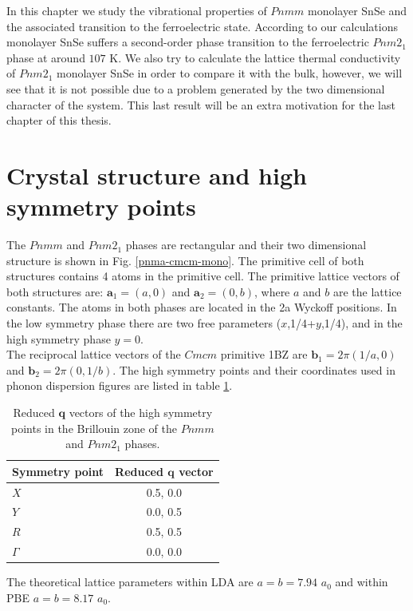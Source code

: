 In this chapter we study the vibrational properties of $Pnmm$ monolayer SnSe and the associated transition to the 
ferroelectric state. According to our calculations monolayer SnSe suffers a second-order phase transition to the 
ferroelectric $Pnm2_{1}$ phase at around $107$ K. We also try to calculate the lattice thermal conductivity of 
$Pnm2_{1}$ monolayer SnSe in order to compare it with the bulk, however, we will see that it is not possible due to 
a problem generated by the two dimensional character of the system. This last result will be an extra motivation for 
the last chapter of this thesis.

\section{Crystal structure and high symmetry points}

The $Pnmm$ and $Pnm2_{1}$ phases are rectangular and their two dimensional structure is shown in 
Fig. \ref{pnma-cmcm-mono}. The primitive cell of both structures contains 4 atoms in the primitive cell. The 
primitive lattice vectors of both structures are: $\mathbf{a}_{1}=(a,0)$ and $\mathbf{a}_{2}=(0,b)$, where $a$ and 
$b$ are the lattice constants. The atoms in both phases are located in the 2a Wyckoff positions. In the low symmetry 
phase there are two free parameters ($x$,1/4+$y$,1/4), and in the high symmetry phase $y=0$. \\

The reciprocal lattice vectors of the $Cmcm$ primitive 1BZ are $\mathbf{b}_{1}=2\pi(1/a,0)$ and 
$\mathbf{b}_{2}=2\pi(0,1/b)$. The high symmetry points and their coordinates used in phonon dispersion figures are 
listed in table \ref{qpoints-mono}.
\begin{table}
\begin{center}
\begin{tabular*}{0.45\textwidth}{l c}
 \hline
 \hline
             Symmetry point  & Reduced $\mathbf{q}$ vector  \\
 \hline
 $X$                  &  0.5, 0.0 \\
 $Y$                  &  0.0, 0.5 \\
 $R$                  &  0.5, 0.5  \\
 $\Gamma$             &  0.0, 0.0  \\
 \hline
 \hline
\end{tabular*}
\end{center}
\caption{Reduced $\mathbf{q}$ vectors of the high symmetry points in the Brillouin zone of the $Pnmm$ and $Pnm2_{1}$ 
phases.}
\label{qpoints-mono}
\end{table}
The theoretical lattice parameters within LDA are $a=b=7.94$ $a_{0}$ and within PBE $a=b=8.17$ $a_{0}$. 

